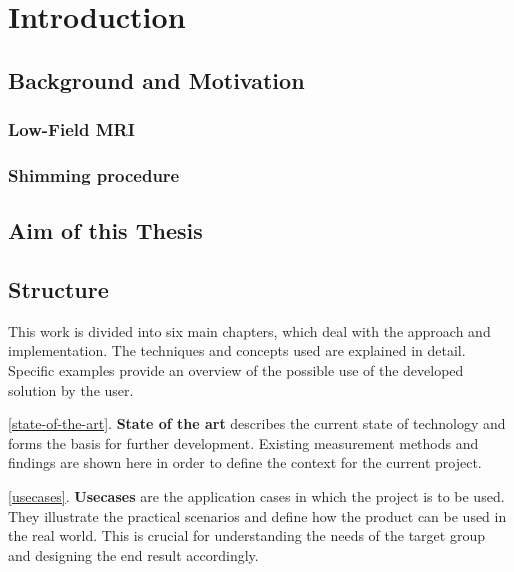 \hypertarget{introduction}{%
\chapter{Introduction}\label{introduction}}

\hypertarget{background-and-motivation}{%
\section{Background and Motivation}\label{background-and-motivation}}

\hypertarget{low-field-mri}{%
\subsection{Low-Field MRI}\label{low-field-mri}}

\hypertarget{shimming-procedure}{%
\subsection{Shimming procedure}\label{shimming-procedure}}

\hypertarget{aim-of-this-thesis}{%
\section{Aim of this Thesis}\label{aim-of-this-thesis}}

\hypertarget{structure}{%
\section{Structure}\label{structure}}

This work is divided into six main chapters, which deal with the
approach and implementation. The techniques and concepts used are
explained in detail. Specific examples provide an overview of the
possible use of the developed solution by the user.

\ref{state-of-the-art}. \textbf{State of the art} describes the current
state of technology and forms the basis for further development.
Existing measurement methods and findings are shown here in order to
define the context for the current project.

\ref{usecases}. \textbf{Usecases} are the application cases in which the
project is to be used. They illustrate the practical scenarios and
define how the product can be used in the real world. This is crucial
for understanding the needs of the target group and designing the end
result accordingly.

